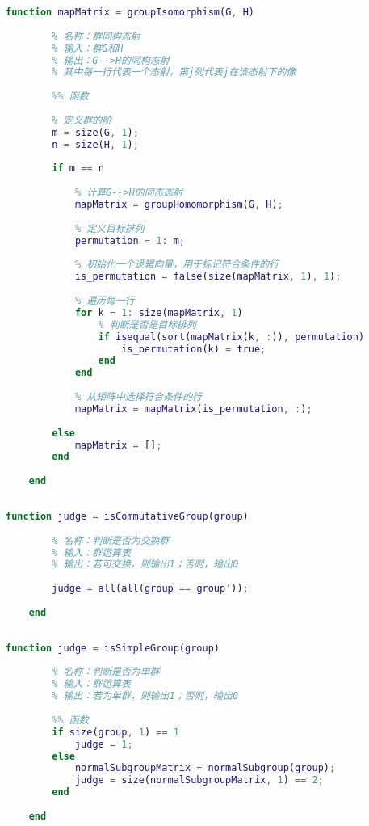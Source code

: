 \begin{lstlisting}[language=Matlab, caption={群同构态射}, label={groupIsomorphism}]
	function mapMatrix = groupIsomorphism(G, H)
	
	    % 名称：群同构态射
	    % 输入：群G和H
	    % 输出：G-->H的同构态射
	    % 其中每一行代表一个态射，第j列代表j在该态射下的像
	
	    %% 函数
	
	    % 定义群的阶
	    m = size(G, 1);
	    n = size(H, 1);
	
	    if m == n
	
	        % 计算G-->H的同态态射
	        mapMatrix = groupHomomorphism(G, H);
	        
	        % 定义目标排列
	        permutation = 1: m;
	        
	        % 初始化一个逻辑向量，用于标记符合条件的行
	        is_permutation = false(size(mapMatrix, 1), 1);
	        
	        % 遍历每一行
	        for k = 1: size(mapMatrix, 1)
	            % 判断是否是目标排列
	            if isequal(sort(mapMatrix(k, :)), permutation)
	                is_permutation(k) = true;
	            end
	        end
	        
	        % 从矩阵中选择符合条件的行
	        mapMatrix = mapMatrix(is_permutation, :);
	
	    else
	        mapMatrix = [];
	    end
	
	end
	
\end{lstlisting}

\begin{lstlisting}[language=Matlab, caption={是否为交换群}, label={isCommutativeGroup}]
	function judge = isCommutativeGroup(group)
	
	    % 名称：判断是否为交换群
	    % 输入：群运算表
	    % 输出：若可交换，则输出1；否则，输出0
	
	    judge = all(all(group == group'));
	
	end
	
\end{lstlisting}

\begin{lstlisting}[language=Matlab, caption={是否为单群}, label={isSimpleGroup}]
	function judge = isSimpleGroup(group)
	
	    % 名称：判断是否为单群
	    % 输入：群运算表
	    % 输出：若为单群，则输出1；否则，输出0
	    
	    %% 函数
	    if size(group, 1) == 1
	        judge = 1;
	    else
	        normalSubgroupMatrix = normalSubgroup(group);
	        judge = size(normalSubgroupMatrix, 1) == 2;
	    end
	
	end
	
\end{lstlisting}

